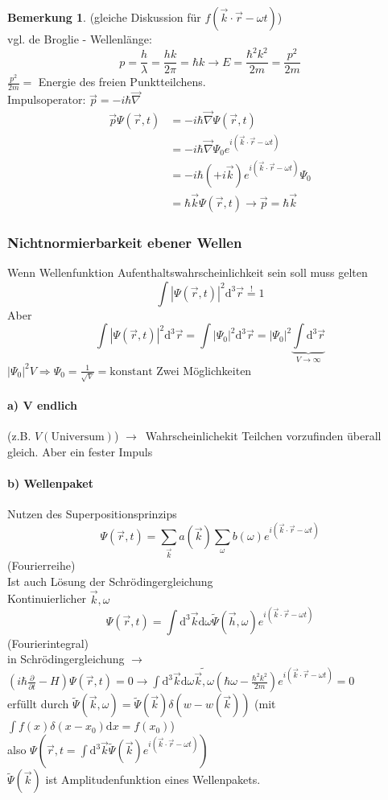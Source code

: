 \documentclass[oneside]{book}
\theoremstyle{definition}
\newtheorem*{bemerkung*}{Bemerkung}
\newcommand{\conseq}{$\rightarrow$~}
\renewcommand{\d}{\mathrm d}
\newcommand{\fpartial}[1]{\frac{\partial}{\partial #1}}
\newcommand{\const}{\text{konstant}}
\begin{document}
\begin{bemerkung*}
	(gleiche Diskussion für $f(\vec{k} \cdot \vec{r} - \omega t)$)\\
	vgl. de Broglie - Wellenlänge:
	$$p = \frac{h}{\lambda} = \frac{hk}{2\pi} = \hbar k \rightarrow E = \frac{\hbar^2 k^2}{2m} = \frac{p^2}{2m}$$
	$\frac{p^2}{2m} = $ Energie des freien Punktteilchens.\\
	Impulsoperator: $\vec{p} = - i \hbar \vec{\nabla}$\\
	\begin{align*}
		\vec{p} \Psi(\vec{r}, t) &= - i \hbar \vec{\nabla} \Psi(\vec{r}, t)\\
		&= -i \hbar \vec{\nabla} \Psi_0 e^{i(\vec{k} \cdot \vec{r} - \omega t)}\\
		&= -i \hbar (+ i \vec{k}) e^{i(\vec{k} \cdot \vec{r} - \omega t)} \Psi_0\\
		&= \hbar \vec{k} \Psi(\vec{r}, t) \rightarrow \vec{p} = \hbar \vec{k} 
	\end{align*}
\end{bemerkung*}
\subsubsection{Nichtnormierbarkeit ebener Wellen}
Wenn Wellenfunktion Aufenthaltswahrscheinlichkeit sein soll muss gelten
$$\int |\Psi(\vec{r}, t)|^2 \d^3 \vec{r} \overset!= 1$$
Aber $$\int |\Psi(\vec{r}, t)|^2 \d^3 \vec{r} = \int |\Psi_0|^2 \d^3 \vec{r} = |\Psi_0|^2 \underbrace{\int \d^3 \vec{r}}_{V \to \infty}$$
$|\Psi_0|^2 V \Rightarrow \Psi_0 = \frac{1}{\sqrt V} = \const$
Zwei Möglichkeiten
\paragraph{a) V endlich} (z.B. $V(\text{Universum})$) \conseq Wahrscheinlichekit Teilchen vorzufinden überall gleich. Aber ein fester Impuls
\paragraph{b) \textbf{Wellenpaket}}
Nutzen des Superpositionsprinzips
$$\Psi(\vec{r}, t) = \sum_{\vec{k}} a (\vec{k}) \sum_{\omega} b(\omega) e^{i(\vec{k}\cdot \vec{r} - \omega t)}$$ (Fourierreihe)\\
Ist auch Lösung der Schrödingergleichung\\
Kontinuierlicher $\vec{k}, \omega$\\
$$\Psi(\vec{r}, t) = \int \d^3 \vec{k} \d \omega \tilde\Psi (\vec{h}, \omega) e^{i(\vec{k}\cdot \vec{r} - \omega t)}$$ (Fourierintegral)\\
in Schrödingergleichung \conseq $(i \hbar \fpartial{t} - H) \Psi(\vec{r}, t) = 0 \rightarrow \int \d^3 \vec{k} \d \omega \tilde{\vec{k}, \omega} (\hbar \omega - \frac{\hbar^2 k^2}{2m}) e^{i(\vec{k}\cdot \vec{r} - \omega t)} = 0$\\
erfüllt durch $\tilde\Psi(\vec{k}, \omega) = \tilde\Psi (\vec{k}) \delta(w -w(\vec k))$ (mit $\int f(x) \delta(x - x_0) \d x = f (x_0)$)\\
also $\Psi(\vec{r}, t = \int \d^3 \vec{k} \tilde{\Psi} (\vec{k}) e^{i(\vec{k}\cdot \vec{r} - \omega t)})$\\
$\tilde \Psi(\vec{k})$ ist Amplitudenfunktion eines Wellenpakets.
\end{document}
